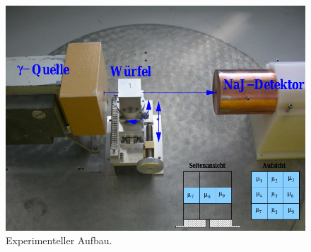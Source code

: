 \begin{figure}[htpb]
  \centering
  \includegraphics[scale=0.3]{bilder/aufbau.png}
  \caption{Experimenteller Aufbau.\cite{AP}}
\label{fig:aufbau}
\end{figure}
